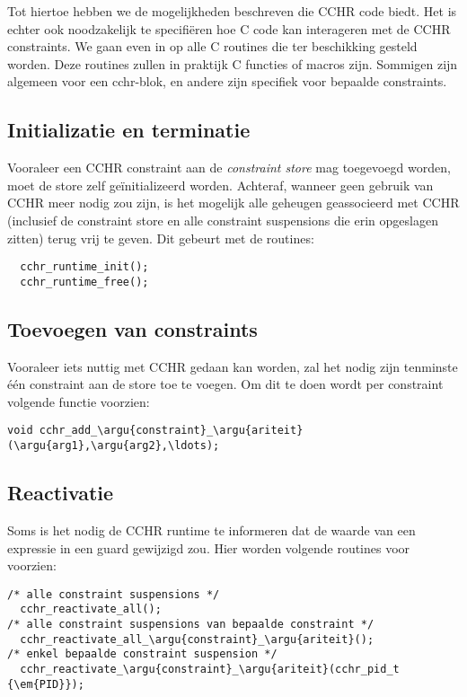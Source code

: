 Tot hiertoe hebben we de mogelijkheden beschreven die CCHR code biedt. Het is echter ook noodzakelijk te specifi\"eren hoe C code kan interageren met de CCHR constraints. We gaan even in op alle C routines die ter beschikking gesteld worden. Deze routines zullen in praktijk C functies of macros zijn. Sommigen zijn algemeen voor een cchr-blok, en andere zijn specifiek voor bepaalde constraints.

\subsection{Initializatie en terminatie}

Vooraleer een CCHR constraint aan de {\em constraint store} mag toegevoegd worden, moet de store zelf ge\"initializeerd worden. Achteraf, wanneer geen gebruik van CCHR meer nodig zou zijn, is het mogelijk alle geheugen geassocieerd met CCHR (inclusief de constraint store en alle constraint suspensions die erin opgeslagen zitten) terug vrij te geven. Dit gebeurt met de routines:
\begin{Verbatim}
  cchr_runtime_init();
  cchr_runtime_free();
\end{Verbatim}

\subsection{Toevoegen van constraints}

Vooraleer iets nuttig met CCHR gedaan kan worden, zal het nodig zijn tenminste \'e\'en constraint aan de store toe te voegen. Om dit te doen wordt per constraint volgende functie voorzien: \begin{Verbatim}[commandchars=\\\{\}]
  void cchr_add_\argu{constraint}_\argu{ariteit}(\argu{arg1},\argu{arg2},\ldots);
\end{Verbatim}

\subsection{Reactivatie}

Soms is het nodig de CCHR runtime te informeren dat de waarde van een expressie in een guard gewijzigd zou. Hier worden volgende routines voor voorzien: \begin{Verbatim}[commandchars=\\\{\}]
/* alle constraint suspensions */
  cchr_reactivate_all(); 
/* alle constraint suspensions van bepaalde constraint */
  cchr_reactivate_all_\argu{constraint}_\argu{ariteit}();
/* enkel bepaalde constraint suspension */
  cchr_reactivate_\argu{constraint}_\argu{ariteit}(cchr_pid_t {\em{PID}});
\end{Verbatim}

